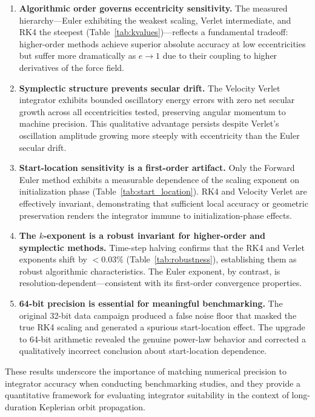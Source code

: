 \documentclass[twocolumn, 10pt]{article}
\begin{document}
\begin{enumerate}[nosep]
    \item \textbf{Algorithmic order governs eccentricity sensitivity.} The measured hierarchy---Euler exhibiting the weakest scaling, Verlet intermediate, and RK4 the steepest (Table~\ref{tab:kvalues})---reflects a fundamental tradeoff: higher-order methods achieve superior absolute accuracy at low eccentricities but suffer more dramatically as $e \to 1$ due to their coupling to higher derivatives of the force field.

    \item \textbf{Symplectic structure prevents secular drift.} The Velocity Verlet integrator exhibits bounded oscillatory energy errors with zero net secular growth across all eccentricities tested, preserving angular momentum to machine precision. This qualitative advantage persists despite Verlet's oscillation amplitude growing more steeply with eccentricity than the Euler secular drift.

    \item \textbf{Start-location sensitivity is a first-order artifact.} Only the Forward Euler method exhibits a measurable dependence of the scaling exponent on initialization phase (Table~\ref{tab:start_location}). RK4 and Velocity Verlet are effectively invariant, demonstrating that sufficient local accuracy or geometric preservation renders the integrator immune to initialization-phase effects.

    \item \textbf{The $k$-exponent is a robust invariant for higher-order and symplectic methods.} Time-step halving confirms that the RK4 and Verlet exponents shift by $< 0.03\%$ (Table~\ref{tab:robustness}), establishing them as robust algorithmic characteristics. The Euler exponent, by contrast, is resolution-dependent---consistent with its first-order convergence properties.

    \item \textbf{64-bit precision is essential for meaningful benchmarking.} The original 32-bit data campaign produced a false noise floor that masked the true RK4 scaling and generated a spurious start-location effect. The upgrade to 64-bit arithmetic revealed the genuine power-law behavior and corrected a qualitatively incorrect conclusion about start-location dependence.
\end{enumerate}

These results underscore the importance of matching numerical precision to integrator accuracy when conducting benchmarking studies, and they provide a quantitative framework for evaluating integrator suitability in the context of long-duration Keplerian orbit propagation.
\end{document}
